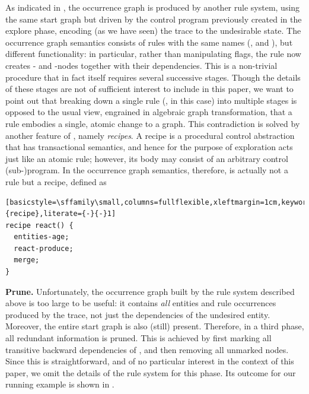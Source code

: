 As indicated in , the occurrence graph is produced by another \GROOVE rule system, using the same start graph but driven by the control program previously created in the explore phase, encoding (as we have seen) the trace to the undesirable state. The occurrence graph semantics consists of rules with the same names (\reactR, \contextR and \firedR), but different functionality: in particular, rather than manipulating \present flags, the \reactR rule now creates \RuleOcc- and \EntityInst-nodes together with their dependencies. This is a non-trivial procedure that in fact itself requires several successive stages. Though the details of these stages are not of sufficient interest to include in this paper, we want to point out that breaking down a single rule (\reactR, in this case) into multiple stages is opposed to the usual view, engrained in algebraic graph transformation, that a rule embodies a single, atomic change to a graph. This contradiction is solved by another feature of \GROOVE, namely \emph{recipes}. A recipe is a procedural control abstraction that has transactional semantics, and hence for the purpose of exploration acts just like an atomic rule; however, its body may consist of an arbitrary control (sub-)program. In the occurrence graph semantics, therefore, \reactR is actually not a rule but a recipe, defined as

\begin{center}
\begin{lstlisting}[basicstyle=\sffamily\small,columns=fullflexible,xleftmargin=1cm,keywords={recipe},literate={-}{-}1]
recipe react() {
  entities-age;
  react-produce;
  merge;
}
\end{lstlisting}
\end{center}
%
\medskip\noindent\textbf{Prune.}
%
Unfortunately, the occurrence graph built by the rule system described above is too large to be useful: it contains \emph{all} entities and rule occurrences produced by the trace, not just the dependencies of the undesired \Forbidden entity. Moreover, the entire start graph is also (still) present. Therefore, in a third phase, all redundant information is pruned. This is achieved by first marking all transitive backward dependencies of \Forbidden, and then removing all unmarked nodes. Since this is straightforward, and of no particular interest in the context of this paper, we omit the details of the \GROOVE rule system for this phase. Its outcome for our running example is shown in .


